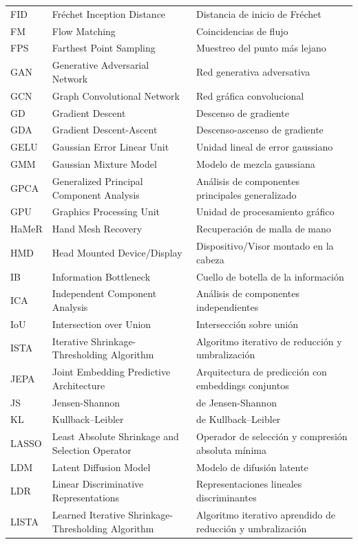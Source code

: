 \documentclass[../book-main_es.tex]{subfiles}
\begin{document}
\begin{longtable}{@{} p{} @{\hspace{1em}} p{} @{\hspace{1em}} p{}}
FID & Fréchet Inception Distance & Distancia de inicio de Fréchet \\
FM & Flow Matching & Coincidencias de flujo \\
FPS & Farthest Point Sampling & Muestreo del punto más lejano \\
GAN & Generative Adversarial Network & Red generativa adversativa \\
GCN & Graph Convolutional Network & Red gráfica convolucional \\
GD & Gradient Descent & Descenso de gradiente \\
GDA & Gradient Descent-Ascent & Descenso-ascenso de gradiente \\
GELU & Gaussian Error Linear Unit & Unidad lineal de error gaussiano \\
GMM & Gaussian Mixture Model & Modelo de mezcla gaussiana \\
GPCA & Generalized Principal Component Analysis & Análisis  de componentes principales generalizado \\
GPU & Graphics Processing Unit & Unidad de procesamiento gráfico \\
HaMeR & Hand Mesh Recovery & Recuperación de malla de mano \\
HMD & Head Mounted Device/Display & Dispositivo/Visor montado en la cabeza \\
IB & Information Bottleneck & Cuello de botella de la información \\
ICA & Independent Component Analysis & Análisis  de componentes independientes \\
IoU & Intersection over Union & Intersección sobre unión \\
ISTA & Iterative Shrinkage-Thresholding Algorithm & Algoritmo iterativo de reducción y umbralización \\
JEPA & Joint Embedding Predictive Architecture & Arquitectura de predicción con embeddings conjuntos \\
JS & Jensen-Shannon & de Jensen-Shannon \\
KL & Kullback–Leibler & de Kullback–Leibler \\
LASSO & Least Absolute Shrinkage and Selection Operator & Operador de selección y compresión absoluta mínima \\
LDM & Latent Diffusion Model & Modelo de difusión latente \\
LDR & Linear Discriminative Representations & Representaciones lineales discriminantes \\
LISTA & Learned Iterative Shrinkage-Thresholding Algorithm & Algoritmo iterativo aprendido de reducción y umbralización \\

\end{longtable}
\end{document}
